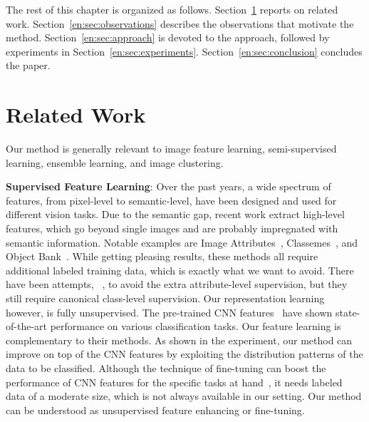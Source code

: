 The rest of this chapter is organized as follows. Section~\ref{en:sec:related}
reports on related work. Section~\ref{en:sec:observations} describes the
observations that motivate the method. Section~\ref{en:sec:approach} is devoted to the approach, followed by experiments in
Section~\ref{en:sec:experiments}. Section~\ref{en:sec:conclusion} concludes the
paper.


\section{Related Work}
\label{en:sec:related}
Our method is generally relevant to image feature learning, semi-supervised
learning, ensemble learning, and image clustering.


\textbf{Supervised Feature Learning}: Over the past years, a wide spectrum of
features, from pixel-level to semantic-level, have been designed and
used for different vision tasks. Due to the semantic gap, recent work
extract high-level features, which go beyond single images and are
probably impregnated with semantic information. Notable examples are
Image Attributes~\citep{ObjectAttribute:cvpr09},
Classemes~\citep{eccv10:classemes}, and Object
Bank~\citep{li:objectbank}. While getting pleasing results, these
methods all require additional labeled training data, which is exactly
what we want to avoid.  There have been
attempts, \eg~\citep{augmented_attribute:eccv12, design_attribute:cvpr13}, to
avoid the extra attribute-level supervision, but they still require
canonical class-level supervision. Our representation learning
however, is fully unsupervised.  
The pre-trained CNN features~\citep{nips12:cnn, caffe14, rich:feature:cvpr14, deep:bmvc14}
have shown state-of-the-art performance on various classification tasks. Our feature 
learning is complementary to their methods. As shown in the experiment, our method can improve on top of 
the CNN features by exploiting the distribution patterns of the data to be classified.  
Although the technique of fine-tuning can 
boost the performance of CNN features for 
the specific tasks at hand~\citep{midlevel:transfer, cnn:transferable}, it needs labeled data of a moderate size, 
which is not always available in our setting.
Our method can be understood as unsupervised feature enhancing or fine-tuning.


